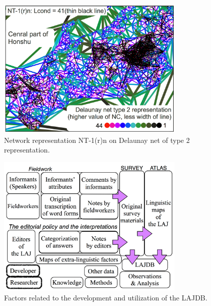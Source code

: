\documentclass[output=paper]{LSP/langsci}
\begin{document}
\begin{figure}
\includegraphics[width=0.8\textwidth]{illustrations/kuma_fig25}
\caption{Network representation NT-1(r)n on Delaunay net of type 2 representation.}
\label{fig:25}
\end{figure}  

\begin{figure}
\includegraphics[width=0.8\textwidth]{illustrations/kuma_fig26}
\caption{Factors related to the development and utilization of the LAJDB.}
\label{fig:26}
\end{figure}  
\end{document}
